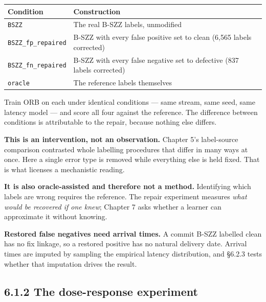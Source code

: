 \begin{longtable}[]{@{}
  >{\raggedright\arraybackslash}p{}
  >{\raggedright\arraybackslash}p{}@{}}
\toprule\noalign{}
\begin{minipage}[b]{\linewidth}\raggedright
Condition
\end{minipage} & \begin{minipage}[b]{\linewidth}\raggedright
Construction
\end{minipage} \\
\midrule\noalign{}
\endhead
\bottomrule\noalign{}
\endlastfoot
\texttt{BSZZ} & The real B-SZZ labels, unmodified \\
\texttt{BSZZ\_fp\_repaired} & B-SZZ with every false positive set to
clean (6,565 labels corrected) \\
\texttt{BSZZ\_fn\_repaired} & B-SZZ with every false negative set to
defective (837 labels corrected) \\
\texttt{oracle} & The reference labels themselves \\
\end{longtable}

Train ORB on each under identical conditions --- same stream, same seed,
same latency model --- and score all four against the reference. The
difference between conditions is attributable to the repair, because
nothing else differs.

\textbf{This is an intervention, not an observation.} Chapter 5's
label-source comparison contrasted whole labelling procedures that
differ in many ways at once. Here a single error type is removed while
everything else is held fixed. That is what licenses a mechanistic
reading.

\textbf{It is also oracle-assisted and therefore not a method.}
Identifying which labels are wrong requires the reference. The repair
experiment measures \emph{what would be recovered if one knew}; Chapter
7 asks whether a learner can approximate it without knowing.

\textbf{Restored false negatives need arrival times.} A commit B-SZZ
labelled clean has no fix linkage, so a restored positive has no natural
delivery date. Arrival times are imputed by sampling the empirical
latency distribution, and \S{}6.2.3 tests whether that imputation drives
the result.

\subsection{6.1.2 The dose-response
experiment}\label{the-dose-response-experiment}

